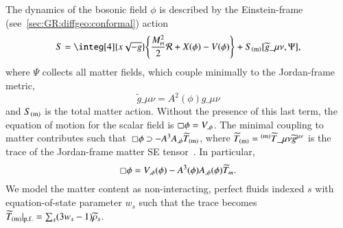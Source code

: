     The dynamics of the bosonic field $\phi$ is described by the Einstein-frame (see~\cref{sec:GR:diffgeo:conformal}) action%
    \begin{equation}\label{eq:cosmo:quintessence:quintessence_action_Einstein}
        S =\integ[4]{x\sqrt{-g}} \cclosed{ \frac{M\nped{Pl}^2}{2} \mathcal{R} + X(\phi) - V(\phi)} + S\ped{(m)}[\widetilde{g}\_{\mu\nu} , \Psi],
    \end{equation} 
    where $\Psi$ collects all matter fields, which couple minimally to the Jordan-frame metric,
    \begin{equation}
        \widetilde{g}\_{\mu\nu} = A^2 (\phi) g\_{\mu\nu}%
    \end{equation}
    and $S_\mathrm{(m)}$ is the total matter action. 
    Without the presence of this last term, the equation of motion for the scalar field is $\sq \phi = V_{,\phi}$. %
    The minimal coupling to matter contributes such that~$\sq\phi \supset - A^{3} A_{,\phi}\widetilde{T}\ped{(m)}$, where $\widetilde{T}\ped{(m)}= {}\ap{(m)}\widetilde{T}\_{\mu\nu}\widetilde{g}\^{\mu\nu}$ is the trace of the Jordan-frame matter SE tensor~\citep{hinterbichlerSymmetronCosmology2011,christiansenAsevolutionRelativisticNbody2023}. In particular, 
    \begin{equation}
        \sq\phi = V_{,\phi}(\phi) - A^{3}(\phi) A_{,\phi}(\phi)\widetilde{T}_m.%
    \end{equation}
    We model the matter content as non-interacting, perfect fluids indexed $s$ with equation-of-state parameter $w_s$ such that the trace becomes $\widetilde{T}_\mathrm{(m)}\rvert_\mathrm{p.f.} = \sum_s (3w_s-1 )\widetilde{\rho}_s$.  
